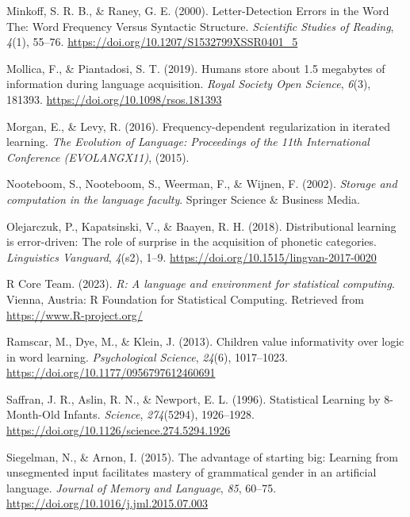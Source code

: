 \documentclass[
  man,floatsintext]{apa6}
\newlength{\cslhangindent}
\newenvironment{CSLReferences}[2] %
 {\begin{list}{}{%
  \setlength{\itemindent}{0pt}
  \setlength{\leftmargin}{0pt}
  \setlength{\parsep}{0pt}
  \ifodd #1
   \setlength{\leftmargin}{\cslhangindent}
   \setlength{\itemindent}{-1\cslhangindent}
  \fi
  \setlength{\itemsep}{#2\baselineskip}}}
 {\end{list}}
\begin{document}
\begin{CSLReferences}{1}{0}
Minkoff, S. R. B., \& Raney, G. E. (2000). Letter-Detection Errors in the Word The: Word Frequency Versus Syntactic Structure. \emph{Scientific Studies of Reading}, \emph{4}(1), 55--76. \url{https://doi.org/10.1207/S1532799XSSR0401_5}

Mollica, F., \& Piantadosi, S. T. (2019). Humans store about 1.5 megabytes of information during language acquisition. \emph{Royal Society Open Science}, \emph{6}(3), 181393. \url{https://doi.org/10.1098/rsos.181393}

Morgan, E., \& Levy, R. (2016). Frequency-dependent regularization in iterated learning. \emph{The Evolution of Language: Proceedings of the 11th International Conference (EVOLANGX11)}, (2015).

Nooteboom, S., Nooteboom, S., Weerman, F., \& Wijnen, F. (2002). \emph{Storage and computation in the language faculty}. Springer Science \& Business Media.

Olejarczuk, P., Kapatsinski, V., \& Baayen, R. H. (2018). Distributional learning is error-driven: The role of surprise in the acquisition of phonetic categories. \emph{Linguistics Vanguard}, \emph{4}(s2), 1--9. \url{https://doi.org/10.1515/lingvan-2017-0020}

R Core Team. (2023). \emph{R: A language and environment for statistical computing}. Vienna, Austria: R Foundation for Statistical Computing. Retrieved from \url{https://www.R-project.org/}

Ramscar, M., Dye, M., \& Klein, J. (2013). Children value informativity over logic in word learning. \emph{Psychological Science}, \emph{24}(6), 1017--1023. \url{https://doi.org/10.1177/0956797612460691}

Saffran, J. R., Aslin, R. N., \& Newport, E. L. (1996). Statistical Learning by 8-Month-Old Infants. \emph{Science}, \emph{274}(5294), 1926--1928. \url{https://doi.org/10.1126/science.274.5294.1926}

Siegelman, N., \& Arnon, I. (2015). The advantage of starting big: Learning from unsegmented input facilitates mastery of grammatical gender in an artificial language. \emph{Journal of Memory and Language}, \emph{85}, 60--75. \url{https://doi.org/10.1016/j.jml.2015.07.003}


\end{CSLReferences}
\end{document}
